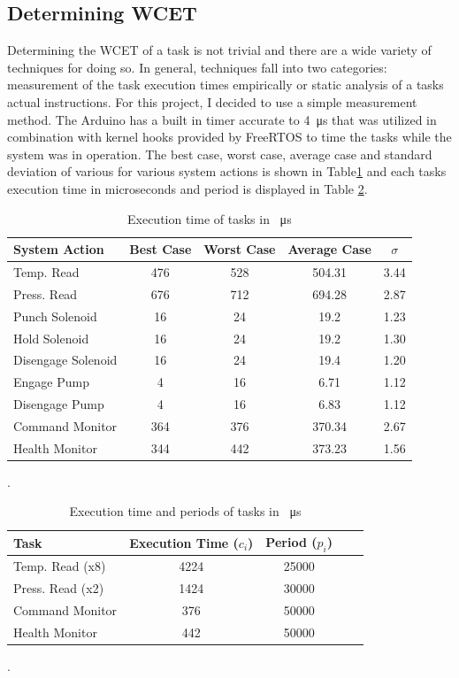 \documentclass{article}
\begin{document}
\subsection{Determining WCET}
Determining the WCET of a task is not trivial and there are a wide variety of techniques for doing so. In general, techniques fall into two categories: measurement of the task execution times empirically or static analysis of a tasks actual instructions. For this project, I decided to use a simple measurement method. The Arduino has a built in timer accurate to \SI{4}{\micro\second} that was utilized in combination with kernel hooks provided by FreeRTOS to time the tasks while the system was in operation. The best case, worst case, average case and standard deviation of various for various system actions is shown in Table\ref{table:execution} and each tasks execution time in microseconds and period is displayed in Table \ref{table:tasks}.

\begin{table}[H]
\begin{center}
\begin{tabular}{ |l|c|c|c|c|}
\hline
\textbf{System Action} & \textbf{Best Case} & \textbf{Worst Case} & \textbf{Average Case} & \textbf{$\sigma$} \\
\hline
Temp. Read &  476 & 528 & 504.31 &3.44\\ 
Press. Read & 676 & 712 &  694.28 & 2.87\\
Punch Solenoid & 16  & 24 & 19.2 & 1.23\\
Hold Solenoid &  16 & 24 & 19.2 & 1.30\\
Disengage Solenoid & 16 & 24 & 19.4 & 1.20\\
Engage Pump & 4 & 16 & 6.71 & 1.12\\
Disengage Pump & 4 & 16 & 6.83 & 1.12\\
Command Monitor & 364 & 376 & 370.34 & 2.67\\
Health Monitor & 344 & 442 & 373.23 & 1.56\\
\hline

\end{tabular}
\caption{Execution time of tasks in \SI{}{\micro\second}}
\label{table:execution}
\end{center}
\end{table}.

\begin{table}[H]
\begin{center}
\begin{tabular}{ |l|c|c|c|c|}
\hline
\textbf{Task} & \textbf{Execution Time ($c_{i}$)
} & \textbf{Period ($p_{i}$)} \\
\hline
Temp. Read (x8) &  4224 & 25000\\ 
Press. Read (x2) & 1424 & 30000\\
Command Monitor & 376 & 50000 \\
Health Monitor & 442 & 50000 \\
\hline

\end{tabular}
\caption{Execution time and periods of tasks in \SI{}{\micro\second}}
\label{table:tasks}
\end{center}
\end{table}.
\end{document}
